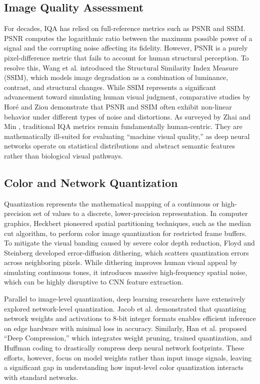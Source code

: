 \documentclass[12pt, a4paper]{article}
\begin{document}
\subsection{Image Quality Assessment}
For decades, IQA has relied on full-reference metrics such as PSNR and SSIM. PSNR computes the logarithmic ratio between the maximum possible power of a signal and the corrupting noise affecting its fidelity. However, PSNR is a purely pixel-difference metric that fails to account for human structural perception. To resolve this, Wang et al. \cite{wang2004} introduced the Structural Similarity Index Measure (SSIM), which models image degradation as a combination of luminance, contrast, and structural changes. While SSIM represents a significant advancement toward simulating human visual judgment, comparative studies by Horé and Ziou \cite{hore2010} demonstrate that PSNR and SSIM often exhibit non-linear behavior under different types of noise and distortions. As surveyed by Zhai and Min \cite{zhai2020}, traditional IQA metrics remain fundamentally human-centric. They are mathematically ill-suited for evaluating ``machine visual quality,'' as deep neural networks operate on statistical distributions and abstract semantic features rather than biological visual pathways.

\subsection{Color and Network Quantization}
Quantization represents the mathematical mapping of a continuous or high-precision set of values to a discrete, lower-precision representation. In computer graphics, Heckbert \cite{heckbert1982} pioneered spatial partitioning techniques, such as the median cut algorithm, to perform color image quantization for restricted frame buffers. To mitigate the visual banding caused by severe color depth reduction, Floyd and Steinberg \cite{floyd1976} developed error-diffusion dithering, which scatters quantization errors across neighboring pixels. While dithering improves human visual appeal by simulating continuous tones, it introduces massive high-frequency spatial noise, which can be highly disruptive to CNN feature extraction.

Parallel to image-level quantization, deep learning researchers have extensively explored network-level quantization. Jacob et al. \cite{jacob2018} demonstrated that quantizing network weights and activations to 8-bit integer formats enables efficient inference on edge hardware with minimal loss in accuracy. Similarly, Han et al. \cite{han2016} proposed ``Deep Compression,'' which integrates weight pruning, trained quantization, and Huffman coding to drastically compress deep neural network footprints. These efforts, however, focus on model weights rather than input image signals, leaving a significant gap in understanding how input-level color quantization interacts with standard networks.
\end{document}
